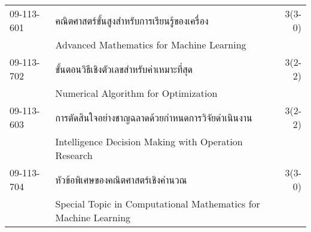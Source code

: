 \begin{longtable}{p{}p{}r{}}
09-113-601 & คณิตศาสตร์ขั้นสูงสำหรับการเรียนรู้ของเครื่อง & 3(3-0)\\
& Advanced Mathematics for Machine Learning & \\[3mm]
09-113-702 & ขั้นตอนวิธีเชิงตัวเลขสำหรับค่าเหมาะที่สุด  & 3(2-2)\\
& Numerical Algorithm for Optimization & \\[3mm]
09-113-603 & การตัดสินใจอย่างชาญฉลาดด้วยกำหนดการวิจัยดำเนินงาน & 3(2-2)\\
& Intelligence Decision Making with Operation Research & \\[3mm]
09-113-704 & หัวข้อพิเศษของคณิตศาสตร์เชิงคำนวณ  & 3(3-0)\\
& Special Topic in Computational Mathematics for Machine Learning & \\[3mm]
\end{longtable}

